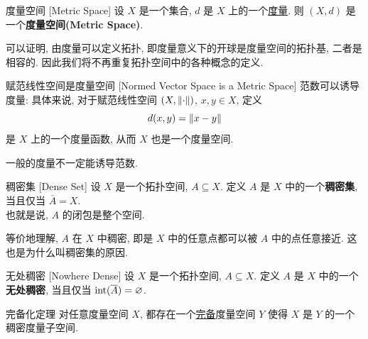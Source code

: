         \begin{dfn}
            [ms]
            {度量空间}
            [Metric Space]
            设 \(X\) 是一个集合, \(d\) 是 \(X\) 上的一个\hyperref[dfn:metric]{度量}. 则 \((X, d)\) 是一个\textbf{度量空间(Metric Space)}.
        \end{dfn}

        \begin{rmk}
            [Dedicatia]
            可以证明, 由度量可以定义拓扑, 即度量意义下的开球是度量空间的拓扑基, 二者是相容的. 因此我们将不再重复拓扑空间中的各种概念的定义.
        \end{rmk}

        \begin{ppt}
            {赋范线性空间是度量空间}
            [Normed Vector Space is a Metric Space]
            范数可以诱导度量: 具体来说, 对于赋范线性空间 \((X, \norm{\cdot})\), \(x,y\in X\), 定义
            \[d(x,y)=\norm{x-y}\]
            是 \(X\) 上的一个度量函数, 从而 \(X\) 也是一个度量空间.
        \end{ppt}

        \begin{rmk}
            [Dedicatia]
            一般的度量不一定能诱导范数.
        \end{rmk}

        \begin{dfn}
            [dense]
            {稠密集}
            [Dense Set]
            设 \(X\) 是一个拓扑空间, \(A\subseteq X\). 定义 \(A\) 是 \(X\) 中的一个\textbf{稠密集}, 当且仅当 \(\overline{A}=X\).  \\
            也就是说, \(A\) 的闭包是整个空间.
        \end{dfn}

        \begin{rmk}
            [Dedicatia]
            等价地理解, \(A\) 在 \(X\) 中稠密, 即是 \(X\) 中的任意点都可以被 \(A\) 中的点任意接近. 这也是为什么叫稠密集的原因.
        \end{rmk}

        \begin{dfn}
            {无处稠密}
            [Nowhere Dense]
            设 \(X\) 是一个拓扑空间, \(A\subseteq X\). 定义 \(A\) 是 \(X\) 中的一个\textbf{无处稠密}, 当且仅当 \(\operatorname{int}(\overline{A})=\varnothing\). 
        \end{dfn}

        \begin{thm}
            {完备化定理}
            对任意度量空间 \(X\), 都存在一个\hyperref[dfn:complete]{完备}度量空间 \(Y\) 使得 \(X\) 是 \(Y\) 的一个稠密度量子空间.
        \end{thm}


